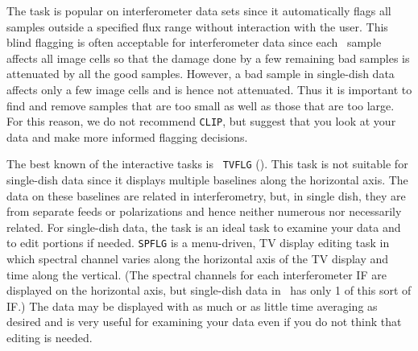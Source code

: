      The task {\tt {}} is popular on interferometer data sets
since it automatically flags all samples outside a specified flux
range without interaction with the user.  This blind flagging is
often acceptable for interferometer data since each \uv\ sample
affects all image cells so that the damage done by a few remaining bad
samples is attenuated by all the good samples.  However, a bad sample
in single-dish data affects only a few image cells and is hence
not attenuated.  Thus it is important to find and remove samples that
are too small as well as those that are too large.  For this reason,
we do not recommend {\tt CLIP}, but suggest that you look at your data
and make more informed flagging decisions.

     The best known of the interactive  tasks is {\tt
TVFLG} ().  This task is not suitable for single-dish data
since it displays multiple baselines along the horizontal axis.  The
data on these baselines are related in interferometry, but, in single
dish, they are from separate feeds or polarizations and hence neither
numerous nor necessarily related.  For 
single-dish data, the task {\tt {}} is an ideal task to
examine your data and to edit portions if needed.  {\tt SPFLG} is a
menu-driven, TV display editing task in which spectral channel varies
along the horizontal axis of the TV display and time along the
vertical.  (The spectral channels for each interferometer IF are
displayed on the horizontal axis, but single-dish data in \AIPS\ has
only 1 of this sort of IF\@.)  The data may be displayed with as much
or as little time averaging as desired and is very useful for
examining your data even if you do not think that editing is needed.

